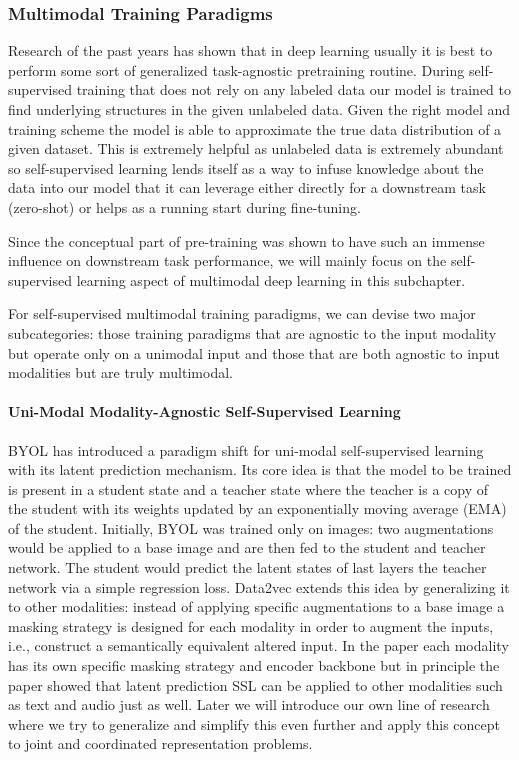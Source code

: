 \documentclass[
]{krantz}
\begin{document}
\hypertarget{multimodal-training-paradigms}{%
\subsubsection{Multimodal Training Paradigms}\label{multimodal-training-paradigms}}

Research of the past years has shown that in deep learning usually it is best to perform some sort of generalized task-agnostic pretraining routine. During self-supervised training that does not rely on any labeled data our model is trained to find underlying structures in the given unlabeled data. Given the right model and training scheme the model is able to approximate the true data distribution of a given dataset. This is extremely helpful as unlabeled data is extremely abundant so self-supervised learning lends itself as a way to infuse knowledge about the data into our model that it can leverage either directly for a downstream task (zero-shot) or helps as a running start during fine-tuning.

Since the conceptual part of pre-training was shown to have such an immense influence on downstream task performance, we will mainly focus on the self-supervised learning aspect of multimodal deep learning in this subchapter.

For self-supervised multimodal training paradigms, we can devise two major subcategories: those training paradigms that are agnostic to the input modality but operate only on a unimodal input and those that are both agnostic to input modalities but are truly multimodal.

\hypertarget{uni-modal-modality-agnostic-self-supervised-learning}{%
\paragraph{Uni-Modal Modality-Agnostic Self-Supervised Learning}\label{uni-modal-modality-agnostic-self-supervised-learning}}

BYOL \citep{grill2020bootstrap} has introduced a paradigm shift for uni-modal self-supervised learning with its latent prediction mechanism. Its core idea is that the model to be trained is present in a student state and a teacher state where the teacher is a copy of the student with its weights updated by an exponentially moving average (EMA) of the student. Initially, BYOL was trained only on images: two augmentations would be applied to a base image and are then fed to the student and teacher network. The student would predict the latent states of last layers the teacher network via a simple regression loss. Data2vec extends this idea by generalizing it to other modalities: instead of applying specific augmentations to a base image a masking strategy is designed for each modality in order to augment the inputs, i.e., construct a semantically equivalent altered input. In the paper each modality has its own specific masking strategy and encoder backbone but in principle the paper showed that latent prediction SSL can be applied to other modalities such as text and audio just as well. Later we will introduce our own line of research where we try to generalize and simplify this even further and apply this concept to joint and coordinated representation problems.
\end{document}
